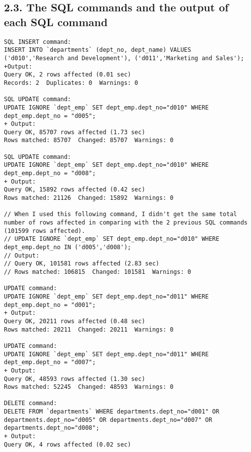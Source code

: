 \documentclass{report}
\begin{document}
\subsection*{2.3. The SQL commands and the output of each SQL command}
\begin{lstlisting}
SQL INSERT command: 
INSERT INTO `departments` (dept_no, dept_name) VALUES ('d010','Research and Development'), ('d011','Marketing and Sales');
+Output:
Query OK, 2 rows affected (0.01 sec)
Records: 2  Duplicates: 0  Warnings: 0

SQL UPDATE command: 
UPDATE IGNORE `dept_emp` SET dept_emp.dept_no="d010" WHERE dept_emp.dept_no = "d005";
+ Output:
Query OK, 85707 rows affected (1.73 sec)
Rows matched: 85707  Changed: 85707  Warnings: 0

SQL UPDATE command:
UPDATE IGNORE `dept_emp` SET dept_emp.dept_no="d010" WHERE dept_emp.dept_no = "d008";
+ Output:
Query OK, 15892 rows affected (0.42 sec)
Rows matched: 21126  Changed: 15892  Warnings: 0

// When I used this following command, I didn't get the same total number of rows affected in comparing with the 2 previous SQL commands (101599 rows affected).
// UPDATE IGNORE `dept_emp` SET dept_emp.dept_no="d010" WHERE dept_emp.dept_no IN ('d005','d008');
// Output:
// Query OK, 101581 rows affected (2.83 sec)
// Rows matched: 106815  Changed: 101581  Warnings: 0

UPDATE command:
UPDATE IGNORE `dept_emp` SET dept_emp.dept_no="d011" WHERE dept_emp.dept_no = "d001";
+ Output:
Query OK, 20211 rows affected (0.48 sec)
Rows matched: 20211  Changed: 20211  Warnings: 0

UPDATE command:
UPDATE IGNORE `dept_emp` SET dept_emp.dept_no="d011" WHERE dept_emp.dept_no = "d007";
+ Output:
Query OK, 48593 rows affected (1.30 sec)
Rows matched: 52245  Changed: 48593  Warnings: 0

DELETE command:
DELETE FROM `departments` WHERE departments.dept_no="d001" OR departments.dept_no="d005" OR departments.dept_no="d007" OR departments.dept_no="d008";
+ Output:
Query OK, 4 rows affected (0.02 sec)

\end{lstlisting}
\end{document}
